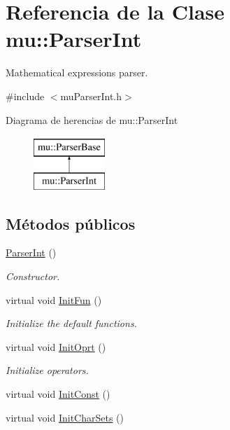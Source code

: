 \hypertarget{classmu_1_1_parser_int}{}\section{Referencia de la Clase mu\+:\+:Parser\+Int}
\label{classmu_1_1_parser_int}


Mathematical expressions parser.  




{\ttfamily \#include $<$mu\+Parser\+Int.\+h$>$}

Diagrama de herencias de mu\+:\+:Parser\+Int\begin{figure}[H]
\begin{center}
\leavevmode
\includegraphics[height=2.000000cm]{classmu_1_1_parser_int}
\end{center}
\end{figure}
\subsection*{Métodos públicos}
\begin{DoxyCompactItemize}
\item 
\hyperlink{classmu_1_1_parser_int_a2e2776f16a30d3f1aa698437f7c4cb5f}{Parser\+Int} ()
\begin{DoxyCompactList}\small\item\em Constructor. \end{DoxyCompactList}\item 
virtual void \hyperlink{classmu_1_1_parser_int_af7aa0bcbee6abf01676a3615206f14de}{Init\+Fun} ()
\begin{DoxyCompactList}\small\item\em Initialize the default functions. \end{DoxyCompactList}\item 
virtual void \hyperlink{classmu_1_1_parser_int_a9bc5fc5f5be541a2329952138ad933e9}{Init\+Oprt} ()
\begin{DoxyCompactList}\small\item\em Initialize operators. \end{DoxyCompactList}\item 
virtual void \hyperlink{classmu_1_1_parser_int_a4c59df078eecbe6ac79749271463b400}{Init\+Const} ()
\item 
virtual void \hyperlink{classmu_1_1_parser_int_aa9589acaa68c3341490ae51bca9b0e78}{Init\+Char\+Sets} ()
\end{DoxyCompactItemize}
